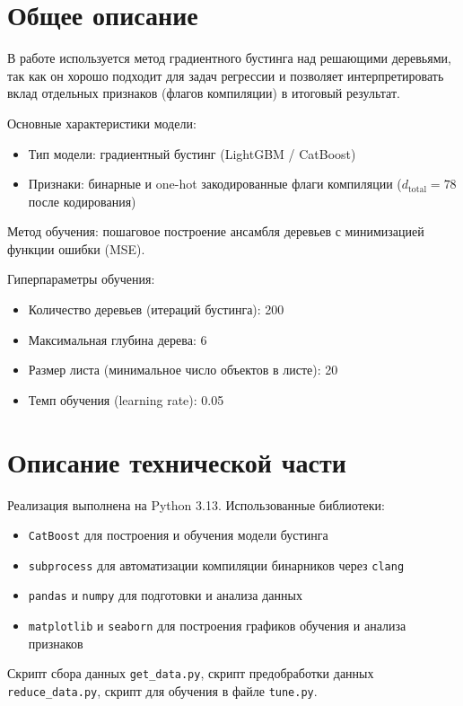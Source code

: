 \documentclass[12pt, oneside]{book}
\begin{document}
\section{Общее описание}
В работе используется метод градиентного бустинга над решающими деревьями,
так как он хорошо подходит для задач регрессии и
позволяет интерпретировать вклад отдельных признаков (флагов компиляции)
в итоговый результат.

\noindent
Основные характеристики модели:
\begin{itemize}
  \item Тип модели: градиентный бустинг (LightGBM / CatBoost)
  \item Признаки: бинарные и one-hot закодированные флаги компиляции
    ($d_{\text{total}} = 78$ после кодирования)
\end{itemize}

\noindent
Метод обучения: пошаговое построение ансамбля деревьев с минимизацией функции
ошибки (MSE).
\vspace*{0.1cm}

\noindent
Гиперпараметры обучения:
\begin{itemize}
  \item Количество деревьев (итераций бустинга): 200
  \item Максимальная глубина дерева: 6
  \item Размер листа (минимальное число объектов в листе): 20
  \item Темп обучения (learning rate): 0.05
\end{itemize}

\section{Описание технической части}
\noindent
Реализация выполнена на Python 3.13.
Использованные библиотеки:
\begin{itemize}
  \item \texttt{CatBoost} для построения и обучения модели бустинга
  \item \texttt{subprocess} для автоматизации компиляции бинарников
    через \texttt{clang}
  \item \texttt{pandas} и \texttt{numpy} для подготовки и анализа данных
  \item \texttt{matplotlib} и \texttt{seaborn} для построения
    графиков обучения и анализа признаков
\end{itemize}

\noindent
Скрипт сбора данных \texttt{get\_data.py},
скрипт предобработки данных \texttt{reduce\_data.py},
скрипт для обучения в файле \texttt{tune.py}.
\end{document}
